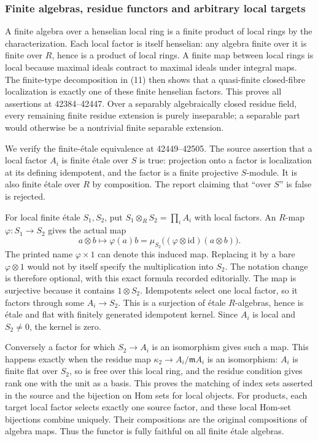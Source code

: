 \subsubsection{Finite algebras, residue functors and arbitrary local targets}\label{algebra-proof-058-finite-algebras-residue-functors-and-arbitrary-local-targets}

A finite algebra over a henselian local ring is a finite product of local rings by the characterization. Each local factor is itself henselian: any algebra finite over it is finite over \(R\), hence is a product of local rings. A finite map between local rings is local because maximal ideals contract to maximal ideals under integral maps. The finite-type decomposition in (11) then shows that a quasi-finite closed-fibre localization is exactly one of these finite henselian factors. This proves all assertions at 42384--42447. Over a separably algebraically closed residue field, every remaining finite residue extension is purely inseparable; a separable part would otherwise be a nontrivial finite separable extension.

We verify the finite-étale equivalence at 42449--42505. The source assertion that a local factor \(A_i\) is finite étale over \(S\) is true: projection onto a factor is localization at its defining idempotent, and the factor is a finite projective \(S\)-module. It is also finite étale over \(R\) by composition. The report claiming that ``over \(S\)'' is false is rejected.

For local finite étale \(S_1,S_2\), put \(S_1\otimes_RS_2=\prod_i A_i\) with local factors. An \(R\)-map \(\varphi:S_1\to S_2\) gives the actual map \[
a\otimes b\longmapsto\varphi(a)b
 =\mu_{S_2}\bigl((\varphi\otimes\mathrm{id})(a\otimes b)\bigr).
\] The printed name \(\varphi\times1\) can denote this induced map. Replacing it by a bare \(\varphi\otimes1\) would not by itself specify the multiplication into \(S_2\). The notation change is therefore optional, with this exact formula recorded editorially. The map is surjective because it contains \(1\otimes S_2\). Idempotents select one local factor, so it factors through some \(A_i\to S_2\). This is a surjection of étale \(R\)-algebras, hence is étale and flat with finitely generated idempotent kernel. Since \(A_i\) is local and \(S_2\ne0\), the kernel is zero.

Conversely a factor for which \(S_2\to A_i\) is an isomorphism gives such a map. This happens exactly when the residue map \(\kappa_2\to A_i/\mathfrak mA_i\) is an isomorphism: \(A_i\) is finite flat over \(S_2\), so is free over this local ring, and the residue condition gives rank one with the unit as a basis. This proves the matching of index sets asserted in the source and the bijection on Hom sets for local objects. For products, each target local factor selects exactly one source factor, and these local Hom-set bijections combine uniquely. Their compositions are the original compositions of algebra maps. Thus the functor is fully faithful on all finite étale algebras.

